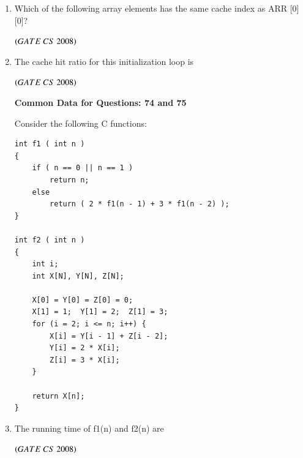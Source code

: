 \documentclass[journal]{IEEEtran}
\numberwithin{equation}{enumi}
\numberwithin{figure}{enumi}
\begin{document}
\begin{enumerate}
\item Which of the following array elements has the same cache index as ARR [0] [0]?
\begin{enumerate}
\end{enumerate}
\hfill $\left(GATE\ CS\  2008\right)$

\item The cache hit ratio for this initialization loop is
\begin{enumerate} 
\end{enumerate}
\hfill $\left(GATE\ CS\  2008\right)$

\begin{center}
\textbf{ Common Data for Questions: 74 and 75}
\end{center}

Consider the following C functions:  

\begin{verbatim}
int f1 ( int n )
{
    if ( n == 0 || n == 1 )
        return n;
    else
        return ( 2 * f1(n - 1) + 3 * f1(n - 2) );
}

int f2 ( int n )
{
    int i;
    int X[N], Y[N], Z[N];

    X[0] = Y[0] = Z[0] = 0;
    X[1] = 1;  Y[1] = 2;  Z[1] = 3;
    for (i = 2; i <= n; i++) {
        X[i] = Y[i - 1] + Z[i - 2];
        Y[i] = 2 * X[i];
        Z[i] = 3 * X[i];
    }

    return X[n];
}
\end{verbatim}

\item The running time of f1(n) and f2(n) are
\begin{enumerate}
\end{enumerate}
\hfill $\left(GATE\ CS\  2008\right)$


\end{enumerate}
\end{document}
